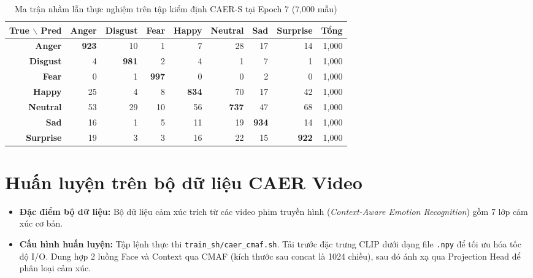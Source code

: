 \documentclass[10pt,a4paper]{article}
\begin{document}
\begin{table}[H]
\centering
\small
\caption{Ma trận nhầm lẫn thực nghiệm trên tập kiểm định CAER-S tại Epoch 7 (7,000 mẫu)}
\label{tab:caers_cm}
\begin{tabular}{r | rrrrrrr | r}
\toprule
\rowcolor{tableheader}
\textbf{True $\backslash$ Pred} & \textbf{Anger} & \textbf{Disgust} & \textbf{Fear} & \textbf{Happy} & \textbf{Neutral} & \textbf{Sad} & \textbf{Surprise} & \textbf{Tổng} \\
\midrule
\textbf{Anger}    & \textbf{923} & 10  & 1   & 7   & 28  & 17  & 14  & 1,000 \\
\textbf{Disgust}  & 4   & \textbf{981} & 2   & 4   & 1   & 7   & 1   & 1,000 \\
\textbf{Fear}     & 0   & 1   & \textbf{997} & 0   & 0   & 2   & 0   & 1,000 \\
\textbf{Happy}    & 25  & 4   & 8   & \textbf{834} & 70  & 17  & 42  & 1,000 \\
\textbf{Neutral}  & 53  & 29  & 10  & 56  & \textbf{737} & 47  & 68  & 1,000 \\
\textbf{Sad}      & 16  & 1   & 5   & 11  & 19  & \textbf{934} & 14  & 1,000 \\
\textbf{Surprise} & 19  & 3   & 3   & 16  & 22  & 15  & \textbf{922} & 1,000 \\
\bottomrule
\end{tabular}
\end{table}

\section{Huấn luyện trên bộ dữ liệu CAER Video}
\begin{itemize}[leftmargin=18pt, itemsep=2pt]
    \item \textbf{Đặc điểm bộ dữ liệu:} Bộ dữ liệu cảm xúc trích từ các video phim truyền hình (\textit{Context-Aware Emotion Recognition}) gồm 7 lớp cảm xúc cơ bản.
    \item \textbf{Cấu hình huấn luyện:} Tập lệnh thực thi \texttt{train\_sh/caer\_cmaf.sh}. Tải trước đặc trưng CLIP dưới dạng file \texttt{.npy} để tối ưu hóa tốc độ I/O. Dung hợp 2 luồng Face và Context qua CMAF (kích thước sau concat là 1024 chiều), sau đó ánh xạ qua Projection Head để phân loại cảm xúc.
\end{itemize}
\end{document}

